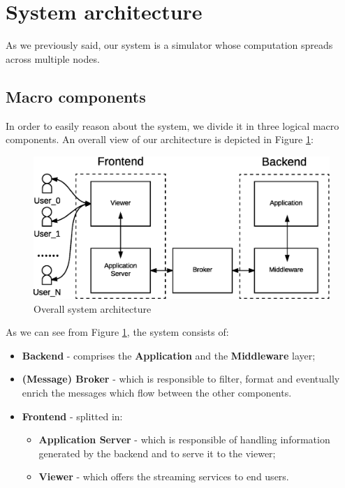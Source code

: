 \section{System architecture}
As we previously said, our system is a simulator whose computation spreads
across multiple nodes.

\subsection{Macro components}

In order to easily reason about the system, we
divide it in three logical macro components.
An overall view of our architecture
is depicted in Figure \ref{fig:sd-sys-arch-overall}:

\begin{figure}[H]
  \centering
  \includegraphics[scale=0.5,keepaspectratio]
    {images/solution/overall-arch.eps}
  \caption{Overall system architecture}
  \label{fig:sd-sys-arch-overall}
\end{figure}

As we can see from Figure \ref{fig:sd-sys-arch-overall}, the system consists of:

\begin{itemize}
  \item \textbf{Backend} - comprises the \textbf{Application} and the
    \textbf{Middleware} layer;
  \item \textbf{(Message) Broker} - which is responsible to filter, format
    and eventually enrich the messages which flow between the other components.
  \item \textbf{Frontend} - splitted in:
  \begin{itemize}
    \item \textbf{Application Server} - which is responsible of handling
      information generated by the backend and to serve it to the viewer;
    \item \textbf{Viewer} - which offers the streaming services to end users.
  \end{itemize}
\end{itemize}

